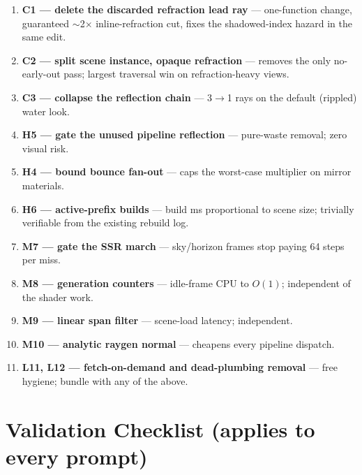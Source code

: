 \documentclass[11pt,a4paper]{article}
\begin{document}
\begin{enumerate}
    \item \textbf{C1 --- delete the discarded refraction lead ray} --- one-function change, guaranteed $\sim$2$\times$ inline-refraction cut, fixes the shadowed-index hazard in the same edit.
    \item \textbf{C2 --- split scene instance, opaque refraction} --- removes the only no-early-out pass; largest traversal win on refraction-heavy views.
    \item \textbf{C3 --- collapse the reflection chain} --- 3$\rightarrow$1 rays on the default (rippled) water look.
    \item \textbf{H5 --- gate the unused pipeline reflection} --- pure-waste removal; zero visual risk.
    \item \textbf{H4 --- bound bounce fan-out} --- caps the worst-case multiplier on mirror materials.
    \item \textbf{H6 --- active-prefix builds} --- build ms proportional to scene size; trivially verifiable from the existing rebuild log.
    \item \textbf{M7 --- gate the SSR march} --- sky/horizon frames stop paying 64 steps per miss.
    \item \textbf{M8 --- generation counters} --- idle-frame CPU to $O(1)$; independent of the shader work.
    \item \textbf{M9 --- linear span filter} --- scene-load latency; independent.
    \item \textbf{M10 --- analytic raygen normal} --- cheapens every pipeline dispatch.
    \item \textbf{L11, L12 --- fetch-on-demand and dead-plumbing removal} --- free hygiene; bundle with any of the above.
\end{enumerate}

\section{Validation Checklist (applies to every prompt)}
\end{document}
